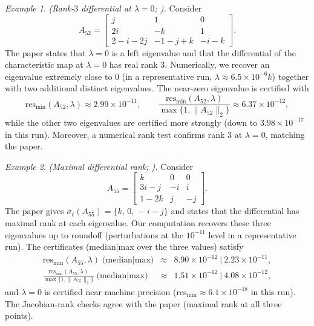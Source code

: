 \documentclass[preprint,12pt]{elsarticle}  %
\theoremstyle{definition}
\theoremstyle{definition}
\theoremstyle{definition}
\theoremstyle{definition}
\theoremstyle{definition}
\theoremstyle{remark}
\theoremstyle{remark}
\newtheorem{Ex}{Example}
\theoremstyle{remark}
\DeclareRobustCommand{\i}{\ensuremath{\mathbf{i}}}
\DeclareRobustCommand{\j}{\ensuremath{\mathbf{j}}}
\DeclareRobustCommand{\k}{\ensuremath{\mathbf{k}}}
\def\i{i}\def\j{j}\def\k{k}%
\begin{document}
\begin{Ex}\label{ex:MVPS_52}
\emph{(Rank-$3$ differential at $\lambda=0$; \cite[Ex.~52]{MaciasVirgosPereiraSaez2014}).}
Consider
\[
A_{52}=
\begin{bmatrix}
\j & 1 & 0\\
2\i & -\k & 1\\
2-\i-2\j & -1-\j+\k & -\i-\k
\end{bmatrix}.
\]
The paper states that $\lambda=0$ is a left eigenvalue and that the differential of the characteristic map at $\lambda=0$
has real rank $3$.
Numerically, we recover an eigenvalue extremely close to $0$ (in a representative run, $\lambda\approx 6.5\times10^{-6}\k$)
together with two additional distinct eigenvalues.
The near-zero eigenvalue is certified with
\[
\mathrm{res}_{\min}(A_{52},\lambda)\approx 2.99\times10^{-11},
\qquad
\frac{\mathrm{res}_{\min}(A_{52},\lambda)}{\max\{1,\|A_{52}\|_2\}}\approx 6.37\times10^{-12},
\]
while the other two eigenvalues are certified more strongly (down to $3.98\times10^{-17}$ in this run).
Moreover, a numerical rank test confirms rank $3$ at $\lambda=0$, matching the paper.
\end{Ex}

\begin{Ex}\label{ex:MVPS_55}
\emph{(Maximal differential rank; \cite[Ex.~55]{MaciasVirgosPereiraSaez2014}).}
Consider
\[
A_{55}=
\begin{bmatrix}
\k & 0 & 0\\
3\i-\j & -\i & \i\\
1-2\k & \j & -\j
\end{bmatrix}.
\]
The paper gives $\sigma_\ell(A_{55})=\{\k,\,0,\,-\i-\j\}$ and states that the differential has maximal rank at each eigenvalue.
Our computation recovers these three eigenvalues up to roundoff (perturbations at the $10^{-11}$ level in a representative run).
The certificates (median|max over the three values) satisfy
\[
\begin{array}{rcl}
\mathrm{res}_{\min}(A_{55},\lambda)\;
\text{(median|max)}
&\approx& 8.90\times10^{-12}\ \big|\ 2.23\times10^{-11},
\\[2mm]
\frac{\mathrm{res}_{\min}(A_{55},\lambda)}{\max\{1,\|A_{55}\|_2\}}\;
\text{(median|max)}
&\approx& 1.51\times10^{-12}\ \big|\ 4.08\times10^{-12},
\end{array}
\]
and $\lambda=0$ is certified near machine precision ($\mathrm{res}_{\min}\approx 6.1\times10^{-18}$ in this run).
The Jacobian-rank checks agree with the paper (maximal rank at all three points).
\end{Ex}
\end{document}
